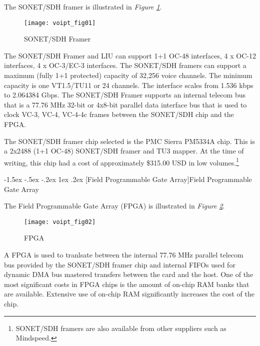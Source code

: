 \documentclass[letterpaper,final,notitlepage,twocolumn,10pt,twoside]{article}
\makeatletter
\let\normalsize = \small
\let\small = \footnotesize
\let\footnotesize = \scriptsize
\let\scriptsize = \tiny
\renewcommand\subsection{\@startsection{subsection}{2}{\z@}%
                                     {-1.5ex \@plus -.5ex \@minus -.2ex}%
                                     {1ex \@plus .2ex}%
                                     {\normalfont\normalsize\bfseries}}
\makeatother
\begin{document}
The SONET/SDH framer is illustrated in \textsl{Figure \ref{figure:voipt_fig01}}.
\begin{figure}[htp]
\center\texttt{[image: voipt\_fig01]}
\caption[SONET/SDH Framer]{SONET/SDH Framer}
\label{figure:voipt_fig01}
\end{figure}
The SONET/SDH Framer and LIU can support 1+1 OC-48 interfaces, 4 x OC-12
interfaces, 4 x OC-3/EC-3 interfaces.  The SONET/SDH framers can support a
maximum (fully 1+1 protected) capacity of 32,256 voice channels.  The minimum
capacity is one VT1.5/TU11 or 24 channels.  The interface scales from 1.536 kbps
to 2.064384 Gbps.  The SONET/SDH Framer supports an internal telecom bus that is a
77.76 MHz 32-bit or 4x8-bit parallel data interface bus that is used to clock
VC-3, VC-4, VC-4-4c frames between the SONET/SDH chip and the FPGA.

The SONET/SDH framer chip selected is the PMC Sierra PM5334A chip.  This is a
2x2488 (1+1 OC-48) SONET/SDH framer and TU3 mapper.  At the time of writing,
this chip had a cost of approximately \$315.00 USD in low
volumes.\footnote{
SONET/SDH framers are also available from other suppliers such as Mindspeed.}

\subsection[Field Programmable Gate Array]{Field Programmable Gate Array}

The Field Programmable Gate Array (FPGA) is illustrated in \textsl{Figure
\ref{figure:voipt_fig02}}.
\begin{figure}[htp]
\center\texttt{[image: voipt\_fig02]}
\caption[FPGA]{FPGA}
\label{figure:voipt_fig02}
\end{figure}
A FPGA is used to tranlsate between the internal 77.76 MHz parallel telecom bus
provided by the SONET/SDH framer chip and internal FIFOs used for dynamic DMA
bus mastered transfers between the card and the host.  One of the most
significant costs in FPGA chips is the amount of on-chip RAM banks that are
available.  Extensive use of on-chip RAM significantly increases the cost of the
chip.
\end{document}
